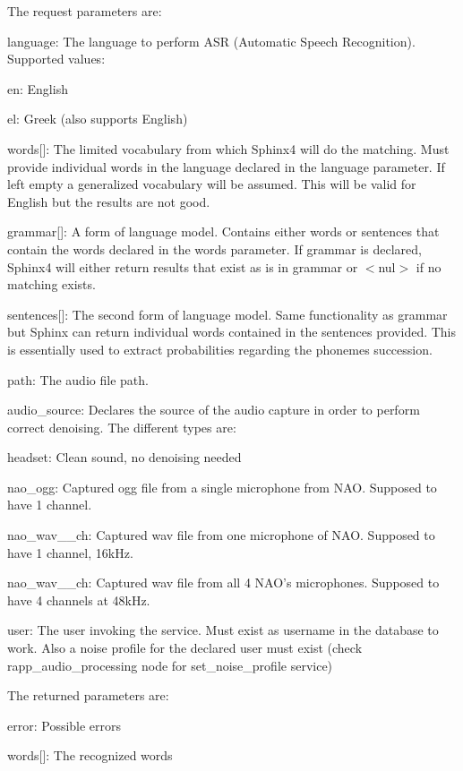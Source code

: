 The request parameters are\-:


\begin{DoxyItemize}
\item {\ttfamily language}\-: The language to perform A\-S\-R (Automatic Speech Recognition). Supported values\-:
\begin{DoxyItemize}
\item {\ttfamily en}\-: English
\item {\ttfamily el}\-: Greek (also supports English)
\end{DoxyItemize}
\item {\ttfamily words\mbox{[}\mbox{]}}\-: The limited vocabulary from which Sphinx4 will do the matching. Must provide individual words in the language declared in the language parameter. If left empty a generalized vocabulary will be assumed. This will be valid for English but the results are not good.
\item {\ttfamily grammar\mbox{[}\mbox{]}}\-: A form of language model. Contains either words or sentences that contain the words declared in the words parameter. If grammar is declared, Sphinx4 will either return results that exist as is in grammar or $<$nul$>$ if no matching exists.
\item {\ttfamily sentences\mbox{[}\mbox{]}}\-: The second form of language model. Same functionality as grammar but Sphinx can return individual words contained in the sentences provided. This is essentially used to extract probabilities regarding the phonemes succession.
\item {\ttfamily path}\-: The audio file path.
\item {\ttfamily audio\-\_\-source}\-: Declares the source of the audio capture in order to perform correct denoising. The different types are\-:
\begin{DoxyItemize}
\item headset\-: Clean sound, no denoising needed
\item nao\-\_\-ogg\-: Captured ogg file from a single microphone from N\-A\-O. Supposed to have 1 channel.
\item nao\-\_\-wav\-\_\-\_\-ch\-: Captured wav file from one microphone of N\-A\-O. Supposed to have 1 channel, 16k\-Hz.
\item nao\-\_\-wav\-\_\-\_\-ch\-: Captured wav file from all 4 N\-A\-O's microphones. Supposed to have 4 channels at 48k\-Hz.
\end{DoxyItemize}
\item {\ttfamily user}\-: The user invoking the service. Must exist as username in the database to work. Also a noise profile for the declared user must exist (check rapp\-\_\-audio\-\_\-processing node for set\-\_\-noise\-\_\-profile service)
\end{DoxyItemize}

The returned parameters are\-:


\begin{DoxyItemize}
\item {\ttfamily error}\-: Possible errors
\item {\ttfamily words\mbox{[}\mbox{]}}\-: The recognized words 
\end{DoxyItemize}